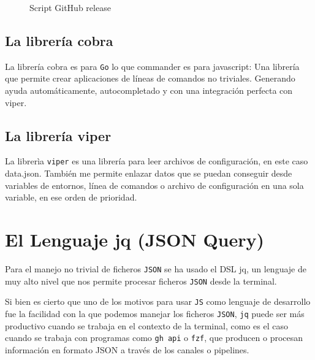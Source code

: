\begin{figure}[htb]
    \centering
    \caption{Script GitHub release}
    \label{fig:gitHubRelease}
\end{figure}

\subsection{La librería cobra}
La librería cobra \cite{cobra} es para \verb|Go| lo que commander es para javascript: Una librería que permite crear aplicaciones de líneas de comandos no triviales. Generando ayuda automáticamente, autocompletado y con una integración perfecta con viper.

\subsection{La librería viper}
La librerìa
{\tt viper}\cite{viper} es una librería para leer archivos de configuración, en este caso data.json. 
También me permite enlazar datos que se puedan conseguir desde variables de entornos, línea de comandos o archivo de configuración en una sola variable, en ese orden de prioridad.

\section{El Lenguaje jq (JSON Query)}

Para el manejo no trivial de ficheros \verb|JSON| se ha usado el \gls{DSL} jq\cite{jq}, un lenguaje de muy alto nivel que nos permite procesar ficheros \verb|JSON| desde la terminal. 

Si bien es cierto que uno de los motivos para usar \verb|JS| como lenguaje de desarrollo fue la facilidad con la que podemos manejar los ficheros \verb|JSON|, \verb|jq| puede ser más productivo cuando se trabaja en el contexto de la terminal, como es el caso cuando se trabaja con programas como \verb|gh api| o \verb"fzf", que  producen o procesan información en formato JSON a través de los canales o pipelines. 

